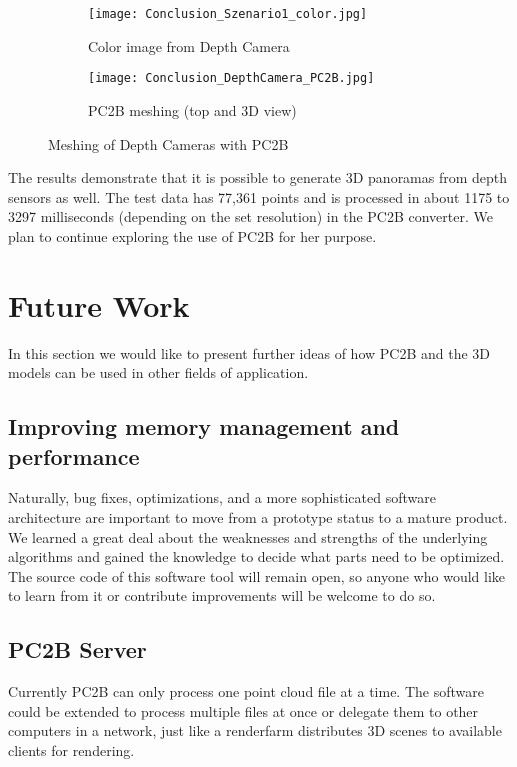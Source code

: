 \begin{figure}[h]
	\centering
	\begin{subfigure}[b]{0.4\textwidth}
		\centering
		\texttt{[image: Conclusion\_Szenario1\_color.jpg]}
		\caption{Color image from Depth Camera}
		\label{fig:conclusion_depth_camera_color}
	\end{subfigure}
	\hfill
	\begin{subfigure}[b]{0.59\textwidth}
		\centering
		\texttt{[image: Conclusion\_DepthCamera\_PC2B.jpg]}
		\caption{PC2B meshing (top and 3D view)}
		\label{fig:conclusion_depth_camera_pc2b}
	\end{subfigure}
	\caption{Meshing of Depth Cameras with PC2B}
	\label{fig:conclusion_depth_camera_meshing}
\end{figure}

The results demonstrate that it is possible to generate 3D panoramas from depth sensors as well. The test data has 77,361 points and is processed in about 1175 to 3297 milliseconds (depending on the set resolution) in the PC2B converter. We plan to continue exploring the use of PC2B for her purpose.

\section{Future Work}

In this section we would like to present further ideas of how PC2B and the 3D models can be used in other fields of application.

\subsection{Improving memory management and performance}

Naturally, bug fixes, optimizations, and a more sophisticated software architecture are important to move from a prototype status to a mature product. We learned a great deal about the weaknesses and strengths of the underlying algorithms and gained the knowledge to decide what parts need to be optimized. The source code of this software tool will remain open, so anyone who would like to learn from it or contribute improvements will be welcome to do so.

\subsection{PC2B Server}

Currently PC2B can only process one point cloud file at a time. The software could be extended to process multiple files at once or delegate them to other computers in a network, just like a renderfarm distributes 3D scenes to available clients for rendering.

